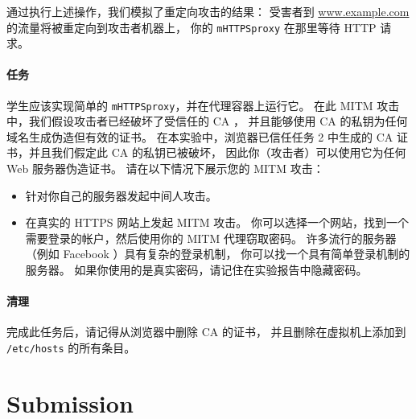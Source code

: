 通过执行上述操作，我们模拟了重定向攻击的结果：
受害者到 \url{www.example.com} 的流量将被重定向到攻击者机器上，
你的 \texttt{mHTTPSproxy} 在那里等待 HTTP 请求。


\paragraph{任务}
学生应该实现简单的 \texttt{mHTTPSproxy}，并在代理容器上运行它。
在此 MITM 攻击中，我们假设攻击者已经破坏了受信任的 CA ，
并且能够使用 CA 的私钥为任何域名生成伪造但有效的证书。
在本实验中，浏览器已信任任务 2 中生成的 CA 证书，并且我们假定此 CA 的私钥已被破坏，
因此你（攻击者）可以使用它为任何 Web 服务器伪造证书。
请在以下情况下展示您的 MITM 攻击：


\begin{itemize}
    \item 针对你自己的服务器发起中间人攻击。

    \item 在真实的 HTTPS 网站上发起 MITM 攻击。
          你可以选择一个网站，找到一个需要登录的帐户，然后使用你的 MITM 代理窃取密码。
          许多流行的服务器（例如 Facebook ）具有复杂的登录机制，
          你可以找一个具有简单登录机制的服务器。
          如果你使用的是真实密码，请记住在实验报告中隐藏密码。
\end{itemize}



\paragraph{清理} 完成此任务后，请记得从浏览器中删除 CA 的证书，
并且删除在虚拟机上添加到 \texttt{/etc/hosts} 的所有条目。



\section{Submission}











